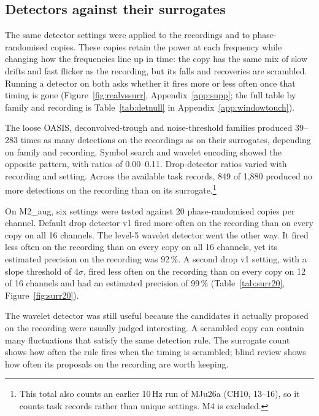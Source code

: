 
\subsection{Detectors against their surrogates}

The same detector settings were applied to the recordings and to phase-randomised copies. These copies retain the power at each frequency while changing how the frequencies line up in time: the copy has the same mix of slow drifts and fast flicker as the recording, but its falls and recoveries are scrambled. Running a detector on both asks whether it fires more or less often once that timing is gone (Figure~\ref{fig:realvssurr}, Appendix~\ref{app:supp}; the full table by family and recording is Table~\ref{tab:detnull} in Appendix~\ref{app:windowtouch}).

The loose OASIS, deconvolved-trough and noise-threshold families produced 39--283 times as many detections on the recordings as on their surrogates, depending on family and recording. Symbol search and wavelet encoding showed the opposite pattern, with ratios of 0.00--0.11. Drop-detector ratios varied with recording and setting. Across the available task records, 849 of 1,880 produced no more detections on the recording than on its surrogate.\footnote{This total also counts an earlier 10\,Hz run of MJu26a (CH10, 13--16), so it counts task records rather than unique settings. M4 is excluded.}

On M2\_aug, six settings were tested against 20 phase-randomised copies per channel. Default drop detector v1 fired more often on the recording than on every copy on all 16 channels. The level-5 wavelet detector went the other way. It fired less often on the recording than on every copy on all 16 channels, yet its estimated precision on the recording was 92\,\%. A second drop v1 setting, with a slope threshold of $4\sigma$, fired less often on the recording than on every copy on 12 of 16 channels and had an estimated precision of 99\,\% (Table~\ref{tab:surr20}, Figure~\ref{fig:surr20}).

The wavelet detector was still useful because the candidates it actually proposed on the recording were usually judged interesting. A scrambled copy can contain many fluctuations that satisfy the same detection rule. The surrogate count shows how often the rule fires when the timing is scrambled; blind review shows how often its proposals on the recording are worth keeping.

